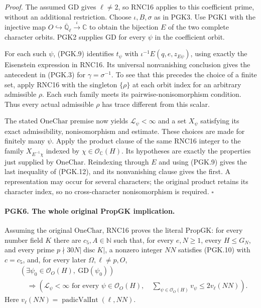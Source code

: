 \documentclass[11pt,a4paper]{article}
\numberwithin{equation}{section}
\theoremstyle{remark}\newtheorem{remark}[theorem]{Remark}
\begin{document}
\emph{Proof.}
The assumed \(\mathrm{GD}\) gives \(\ell\ne2\), so RNC16
applies to this coefficient prime, without an additional
restriction. Choose \(\iota,B,\sigma\) as in PGK3. Use PGK1
with the injective map
\(O\hookrightarrow\overline{\mathbb Q}_\ell
\xrightarrow{\iota}\mathbb C\) to obtain the bijection \(E\)
of the two complete character orbits. PGK2 supplies
\(\mathrm{GD}\) for every \(\psi\) in the coefficient orbit.

For each such \(\psi\), (PGK.9) identifies \(t_\psi\) with
\(\iota^{-1}E(q,e,z_{E\psi})\), using exactly the Eisenstein
expression in RNC16. Its universal nonvanishing conclusion
gives the antecedent in (PGK.3) for \(\gamma=\sigma^{-1}\).
To see that this precedes the choice of a finite set, apply
RNC16 with the singleton \(\{\rho\}\) at each orbit index
for an arbitrary admissible \(\rho\). Each such family meets
its pairwise-nonisomorphism condition. Thus every actual
admissible \(\rho\) has trace different from this scalar.

The stated \(\mathrm{OneChar}\) premise now yields
\(\mathcal L_\psi<\infty\) and a set \(X_\psi\) satisfying
its exact admissibility, nonisomorphism and estimate. These
choices are made for finitely many \(\psi\). Apply the product
clause of the same RNC16 integer to the family
\(X_{E^{-1}\chi}\) indexed by
\(\chi\in\mathcal O_{\mathbb C}(H)\). Its hypotheses are
exactly the properties just supplied by \(\mathrm{OneChar}\).
Reindexing through \(E\) and using (PGK.9) gives the last
inequality of (PGK.12), and its nonvanishing clause gives the
first. A representation may occur for several characters;
the original product retains its character index, so no
cross-character nonisomorphism is required. \hfill\(\square\)

\paragraph{PGK6. The whole original PropGK implication.}
\label{claim:PGK6}
Assuming the original \(\mathrm{OneChar}\), RNC16 proves the
literal \(\mathrm{PropGK}\): for every number field \(K\) there
are \(c_5,A\in\mathbb N\) such that, for every
\(e,N\ge1\), every \(H\le G_N\), and every prime
\(p\nmid30N|\operatorname{disc}K|\), a nonzero integer \(NN\)
satisfies (PGK.10) with \(c=c_5\), and, for every later
\(\Omega,\ell\ne p,O\),
\[
 \begin{split}
 &(\exists\psi_0\in\mathcal O_O(H),\ \mathrm{GD}(\psi_0))\\
 &\quad\Longrightarrow
   \left(\mathcal L_\psi<\infty\text{ for every }\psi\in
                        \mathcal O_O(H),\quad
     \sum_{\psi\in\mathcal O_O(H)}v_\psi
                           \le2v_\ell(NN)\right).
 \end{split}                                                     \tag{PGK.13}
\]
Here \(v_\ell(NN)=\operatorname{padicValInt}(\ell,NN)\).
\end{document}
